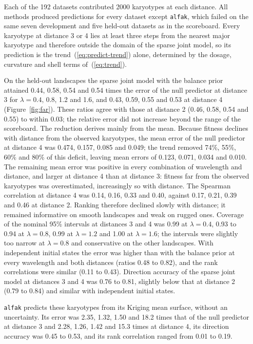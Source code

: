 \documentclass[11pt]{article}
\begin{document}
Each of the 192 datasets contributed 2000 karyotypes at each distance. All
methods produced predictions for every dataset except \texttt{alfak}, which
failed on the same seven development and five held-out datasets as in the
scoreboard. Every karyotype at distance 3 or 4 lies at least three steps from
the nearest major karyotype and therefore outside the domain of the sparse
joint model, so its prediction is the trend~(\ref{eq:predict-trend}) alone,
determined by the dosage, curvature and shell terms of~(\ref{eq:trend}).

On the held-out landscapes the sparse joint model with the balance prior
attained 0.44, 0.58, 0.54 and 0.54 times the error of the null predictor at
distance 3 for $\lambda=0.4$, 0.8, 1.2 and 1.6, and 0.43, 0.59, 0.55 and 0.53
at distance 4 (Figure~\ref{fig:far}). These ratios agree with those at
distance 2 (0.46, 0.58, 0.54 and 0.55) to within 0.03; the relative error did
not increase beyond the range of the scoreboard. The reduction derives mainly
from the mean. Because fitness declines with distance from the observed
karyotypes, the mean error of the null predictor at distance 4 was 0.474,
0.157, 0.085 and 0.049; the trend removed 74\%, 55\%, 60\% and 80\% of this
deficit, leaving mean errors of 0.123, 0.071, 0.034 and 0.010. The remaining
mean error was positive in every combination of wavelength and distance, and
larger at distance 4 than at distance 3: fitness far from the observed
karyotypes was overestimated, increasingly so with distance. The Spearman
correlation at distance 4 was 0.14, 0.16, 0.33 and 0.40, against 0.17, 0.21,
0.39 and 0.46 at distance 2. Ranking therefore declined slowly with distance;
it remained informative on smooth landscapes and weak on rugged ones.
Coverage of the nominal 95\% intervals at distances 3 and 4 was 0.99 at
$\lambda=0.4$, 0.93 to 0.94 at $\lambda=0.8$, 0.99 at $\lambda=1.2$
and 1.00 at $\lambda=1.6$; the intervals were slightly too narrow at
$\lambda=0.8$ and conservative on the other landscapes. With independent initial states the error
was higher than with the balance prior at every wavelength and both distances
(ratios 0.48 to 0.82), and the rank correlations were similar (0.11 to 0.43).
Direction accuracy of the sparse joint model at distances 3 and 4 was 0.76 to
0.81, slightly below that at distance 2 (0.79 to 0.84) and similar with
independent initial states.

\texttt{alfak} predicts these karyotypes from
its Kriging mean surface, without an uncertainty. Its error was 2.35, 1.32,
1.50 and 18.2 times that of the null predictor at distance 3 and 2.28, 1.26,
1.42 and 15.3 times at distance 4, its direction accuracy was 0.45 to 0.53,
and its rank correlation ranged from 0.01 to 0.19.
\end{document}
